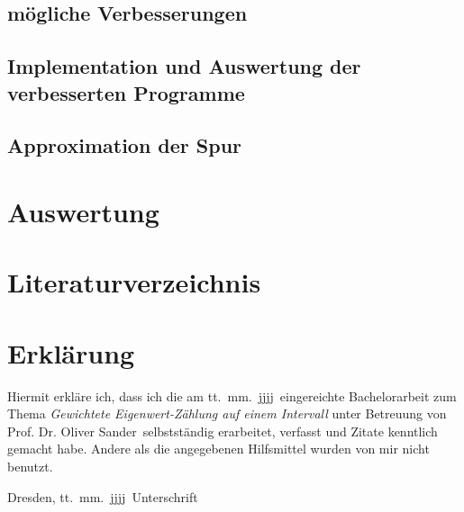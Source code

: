 \documentclass[a4paper,12pt]{report}
\newcommand{\betreuer}{Prof. Dr. Oliver Sander}
\newcommand{\thema}{Gewichtete Eigenwert-Zählung auf einem Intervall}
\newcommand{\datum}{tt.\ mm.\ jjjj} %
\theoremstyle{plain} %
\theoremstyle{definition} %
\theoremstyle{remark}
\begin{document}
      \section{mögliche Verbesserungen}

      \section{Implementation und Auswertung der verbesserten Programme}

      \section{Approximation der Spur}

\chapter{Auswertung}
\label{sec: Auswertung}

\chapter{Literaturverzeichnis}


      \printbibliography


\chapter*{Erkl\"{a}rung}
\thispagestyle{empty}
Hiermit erkl\"{a}re ich, dass ich die am \datum\ eingereichte Bachelorarbeit zum Thema
\emph{\thema} unter Betreuung von \betreuer\ selbstst\"{a}ndig erarbeitet,
verfasst und Zitate kenntlich gemacht habe. Andere als die angegebenen Hilfsmittel
wurden von mir nicht benutzt.

\bigskip \bigskip \bigskip \bigskip \bigskip

Dresden, \datum\ \hfill Unterschrift

\normalsize
\end{document}
